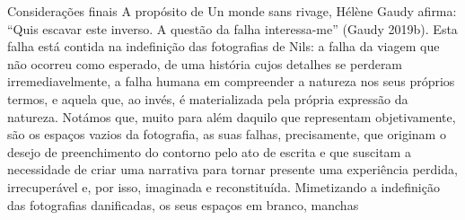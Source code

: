 \documentclass{article}
\begin{document}
Considerações finais
A propósito de Un monde sans rivage, Hélène Gaudy afirma: “Quis escavar este inverso. A questão da falha interessa-me” (Gaudy 2019b). Esta falha está contida na
indefinição das fotografias de Nils: a falha da viagem que não ocorreu como esperado,
de uma história cujos detalhes se perderam irremediavelmente, a falha humana em
compreender a natureza nos seus próprios termos, e aquela que, ao invés, é materializada pela própria expressão da natureza. Notámos que, muito para além daquilo
que representam objetivamente, são os espaços vazios da fotografia, as suas falhas,
precisamente, que originam o desejo de preenchimento do contorno pelo ato de escrita e que suscitam a necessidade de criar uma narrativa para tornar presente uma
experiência perdida, irrecuperável e, por isso, imaginada e reconstituída. Mimetizando a indefinição das fotografias danificadas, os seus espaços em branco, manchas
\end{document}
